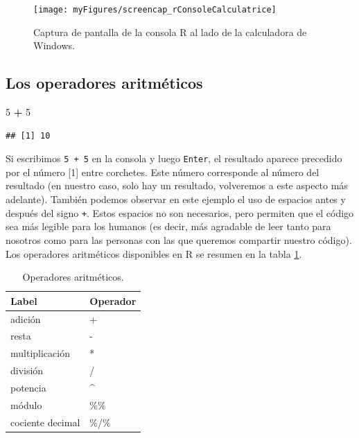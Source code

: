\documentclass[
]{book}
\newenvironment{Shaded}{\begin{snugshade}}{\end{snugshade}}
\newcommand{\DecValTok}[1]{\textcolor[rgb]{0.00,0.00,0.81}{#1}}
\newcommand{\OperatorTok}[1]{\textcolor[rgb]{0.81,0.36,0.00}{\textbf{#1}}}
\newcommand{\StringTok}[1]{\textcolor[rgb]{0.31,0.60,0.02}{#1}}
\begin{document}
\begin{figure}
\texttt{[image: myFigures/screencap\_rConsoleCalculatrice]} \caption{Captura de pantalla de la consola R al lado de la calculadora de Windows.\label{fig:screenCapConsoleCal}}\label{fig:screenCapConsoleCal}
\end{figure}

\hypertarget{l011opari}{%
\subsection{Los operadores aritméticos}\label{l011opari}}

\begin{Shaded}
\begin{Highlighting}[]
\DecValTok{5} \OperatorTok{+}\StringTok{ }\DecValTok{5}
\end{Highlighting}
\end{Shaded}

\begin{verbatim}
## [1] 10
\end{verbatim}

Si escribimos \texttt{5\ +\ 5} en la consola y luego \texttt{Enter}, el resultado aparece precedido por el número {[}1{]} entre corchetes. Este número corresponde al número del resultado (en nuestro caso, solo hay un resultado, volveremos a este aspecto más adelante). También podemos observar en este ejemplo el uso de espacios antes y después del signo \texttt{+}. Estos espacios no son necesarios, pero permiten que el código sea más legible para los humanos (es decir, más agradable de leer tanto para nosotros como para las personas con las que queremos compartir nuestro código).
Los operadores aritméticos disponibles en R se resumen en la tabla \ref{tab:tabOpAri}.

\begin{table}

\caption{\label{tab:tabOpAri}Operadores aritméticos.\label{tab:tabOpAri}}
\centering
\begin{tabular}[t]{l|l}
\hline
Label & Operador\\
\hline
adición & +\\
\hline
resta & -\\
\hline
multiplicación & *\\
\hline
división & /\\
\hline
potencia & \textasciicircum{}\\
\hline
módulo & \%\%\\
\hline
cociente decimal & \%/\%\\
\hline
\end{tabular}
\end{table}
\end{document}
